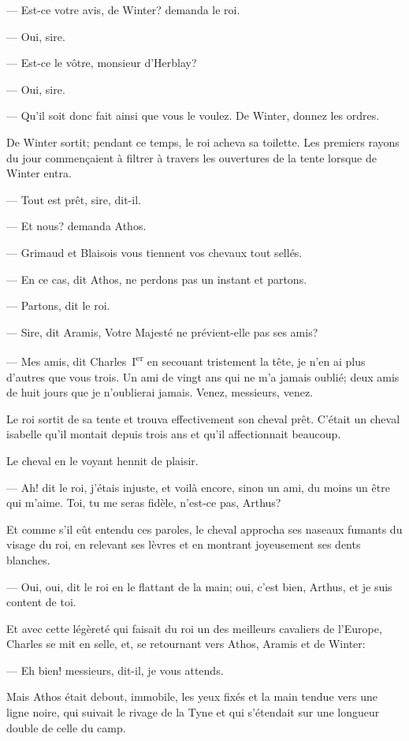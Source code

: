 — Est-ce votre avis, de Winter? demanda le roi.

— Oui, sire.

— Est-ce le vôtre, monsieur d'Herblay?

— Oui, sire.

— Qu'il soit donc fait ainsi que vous le voulez. De Winter, donnez les ordres.

De Winter sortit; pendant ce temps, le roi acheva sa toilette. Les premiers rayons du jour commençaient à filtrer à travers les ouvertures de la tente lorsque de Winter entra.

— Tout est prêt, sire, dit-il.

— Et nous? demanda Athos.

— Grimaud et Blaisois vous tiennent vos chevaux tout sellés.

— En ce cas, dit Athos, ne perdons pas un instant et partons.

— Partons, dit le roi.

— Sire, dit Aramis, Votre Majesté ne prévient-elle pas ses amis?

— Mes amis, dit Charles~I\textsuperscript{er} en secouant tristement la tête, je n'en ai plus d'autres que vous trois. Un ami de vingt ans qui ne m'a jamais oublié; deux amis de huit jours que je n'oublierai jamais. Venez, messieurs, venez.

Le roi sortit de sa tente et trouva effectivement son cheval prêt. C'était un cheval isabelle qu'il montait depuis trois ans et qu'il affectionnait beaucoup.

Le cheval en le voyant hennit de plaisir.

— Ah! dit le roi, j'étais injuste, et voilà encore, sinon un ami, du moins un être qui m'aime. Toi, tu me seras fidèle, n'est-ce pas, Arthus?

Et comme s'il eût entendu ces paroles, le cheval approcha ses naseaux fumants du visage du roi, en relevant ses lèvres et en montrant joyeusement ses dents blanches.

— Oui, oui, dit le roi en le flattant de la main; oui, c'est bien, Arthus, et je suis content de toi.

Et avec cette légèreté qui faisait du roi un des meilleurs cavaliers de l'Europe, Charles se mit en selle, et, se retournant vers Athos, Aramis et de Winter:

— Eh bien! messieurs, dit-il, je vous attends.

Mais Athos était debout, immobile, les yeux fixés et la main tendue vers une ligne noire, qui suivait le rivage de la Tyne et qui s'étendait sur une longueur double de celle du camp.

